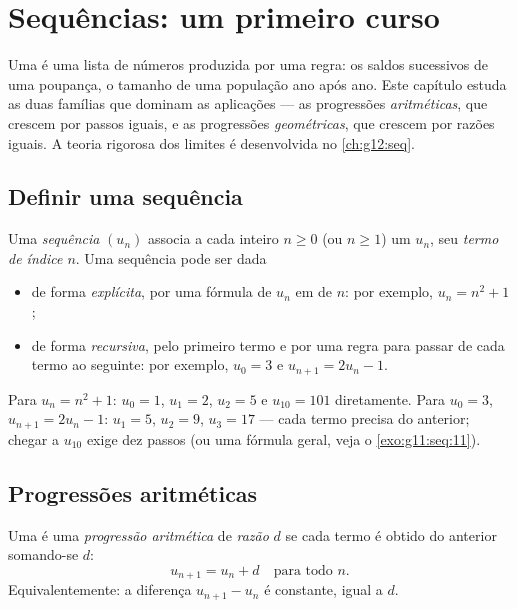 \chapter{Sequências: um primeiro curso}\label{ch:g11:seq}

Uma  é uma lista de números produzida por uma regra: os saldos
sucessivos de uma poupança, o tamanho de uma população ano após ano. Este
capítulo estuda as duas famílias que dominam as aplicações --- as
progressões \emph{aritméticas}, que crescem por passos iguais, e as
progressões \emph{geométricas}, que crescem por razões iguais. A teoria
rigorosa dos limites é desenvolvida no \cref{ch:g12:seq}.

\section{Definir uma sequência}

\begin{definition}[Sequência]\label{def:g11:seq:sequence}
Uma \emph{sequência} $(u_n)$ associa a cada inteiro
$n \geq 0$ (ou $n \geq 1$) um  $u_n$, seu \emph{termo de
índice $n$}. Uma sequência pode ser dada
\begin{itemize}
  \item de forma \emph{explícita}, por uma fórmula de $u_n$ em  de
        $n$: por exemplo, $u_n = n^2 + 1$;
  \item de forma \emph{recursiva}, pelo primeiro termo e por uma regra
        para passar de cada termo ao seguinte: por exemplo, $u_0 = 3$ e
        $u_{n+1} = 2u_n - 1$.
\end{itemize}
\end{definition}

\begin{example}
Para $u_n = n^2 + 1$: $u_0 = 1$, $u_1 = 2$, $u_2 = 5$ e $u_{10} = 101$
diretamente. Para $u_0 = 3$, $u_{n+1} = 2u_n - 1$: $u_1 = 5$, $u_2 = 9$,
$u_3 = 17$ --- cada termo precisa do anterior; chegar a $u_{10}$ exige
dez passos (ou uma fórmula geral, veja o \cref{exo:g11:seq:11}).
\end{example}

\section{Progressões aritméticas}

\begin{definition}\label{def:g11:seq:arithmetic}
Uma  é uma \emph{progressão aritmética} de \emph{razão} $d$ se cada termo é obtido do
anterior somando-se $d$:
\[
u_{n+1} = u_n + d \quad \text{para todo } n.
\]
Equivalentemente: a diferença $u_{n+1} - u_n$ é constante, igual a $d$.
\end{definition}

